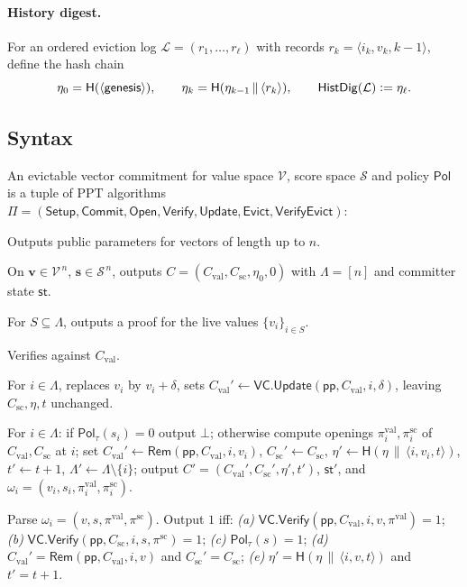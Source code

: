 \documentclass[version=submission]{iacrcc}
\theoremstyle{definition}
\newcommand{\secpar}{\lambda}
\newcommand{\PPT}{\mathrm{PPT}}
\newcommand{\bit}{\{0,1\}}
\newcommand{\defeq}{\vcentcolon=}
\newcommand{\concat}{\,\|\,}
\newcommand{\Setup}{\mathsf{Setup}}
\newcommand{\Commit}{\mathsf{Commit}}
\newcommand{\Open}{\mathsf{Open}}
\newcommand{\Vfy}{\mathsf{Verify}}
\newcommand{\Update}{\mathsf{Update}}
\newcommand{\Evict}{\mathsf{Evict}}
\newcommand{\VfyEvict}{\mathsf{VerifyEvict}}
\newcommand{\Rem}{\mathsf{Rem}}
\newcommand{\pp}{\mathsf{pp}}
\newcommand{\aux}{\mathsf{st}}
\newcommand{\Pol}{\mathsf{Pol}}
\newcommand{\HistDig}{\mathsf{HistDig}}
\newcommand{\Val}{\mathrm{val}}
\newcommand{\Sc}{\mathrm{sc}}
\newcommand{\Cval}{C_{\Val}}
\newcommand{\Csc}{C_{\Sc}}
\newcommand{\Live}{\Lambda}
\newcommand{\Vsp}{\mathcal{V}}
\newcommand{\Ssp}{\mathcal{S}}
\newcommand{\hash}{\mathsf{H}}
\newcommand{\VC}{\mathsf{VC}}
\newcommand{\Log}{\mathcal{L}}
\begin{document}
\paragraph{History digest.}
For an ordered eviction log $\Log=(r_1,\dots,r_\ell)$ with records
$r_k=\langle i_k,v_k,k-1\rangle$, define the hash chain
\[
  \eta_0=\hash(\langle\textsf{genesis}\rangle),\qquad
  \eta_k=\hash(\eta_{k-1}\concat\langle r_k\rangle),\qquad
  \HistDig(\Log)\defeq\eta_\ell .
\]

\subsection{Syntax}

\begin{definition}[EvictVC]\label{def:evictvc}
An evictable vector commitment for value space $\Vsp$, score space $\Ssp$ and
policy $\Pol$ is a tuple of $\PPT$ algorithms
$\Pi=(\Setup,\Commit,\Open,\Vfy,\Update,\Evict,\VfyEvict)$:
\begin{description}[leftmargin=0em,itemsep=4pt]
\item[$\Setup(1^\secpar,1^n)\to\pp$.] Outputs public parameters for vectors of
      length up to $n$.
\item[$\Commit(\pp,\mathbf{v},\mathbf{s})\to(C,\aux)$.] On
      $\mathbf{v}\in\Vsp^{\,n}$, $\mathbf{s}\in\Ssp^{\,n}$, outputs
      $C=(\Cval,\Csc,\eta_0,0)$ with $\Live=[n]$ and committer state $\aux$.
\item[$\Open(\pp,\aux,S)\to\pi$.] For $S\subseteq\Live$, outputs a proof for the
      live values $\{v_i\}_{i\in S}$.
\item[$\Vfy(\pp,C,S,\{v_i\}_{i\in S},\pi)\to\bit$.] Verifies against $\Cval$.
\item[$\Update(\pp,\aux,i,\delta)\to(C',\aux')$.] For $i\in\Live$, replaces $v_i$
      by $v_i+\delta$, sets $\Cval'\leftarrow\VC.\Update(\pp,\Cval,i,\delta)$,
      leaving $\Csc,\eta,t$ unchanged.
\item[$\Evict(\pp,\aux,i,\tau)\to(C',\aux',\omega_i)$ \textnormal{or} $\bot$.]
      For $i\in\Live$: if $\Pol_\tau(s_i)=0$ output $\bot$; otherwise compute
      openings $\pi_i^{\Val},\pi_i^{\Sc}$ of $\Cval,\Csc$ at $i$; set
      $\Cval'\leftarrow\Rem(\pp,\Cval,i,v_i)$, $\Csc'\leftarrow\Csc$,
      $\eta'\leftarrow\hash(\eta\concat\langle i,v_i,t\rangle)$, $t'\leftarrow t+1$,
      $\Live'\leftarrow\Live\setminus\{i\}$; output $C'=(\Cval',\Csc',\eta',t')$,
      $\aux'$, and $\omega_i=(v_i,s_i,\pi_i^{\Val},\pi_i^{\Sc})$.
\item[$\VfyEvict(\pp,C,i,\tau,\omega_i,C')\to\bit$.] Parse
      $\omega_i=(v,s,\pi^{\Val},\pi^{\Sc})$. Output $1$ iff:
      \emph{(a)} $\VC.\Vfy(\pp,\Cval,i,v,\pi^{\Val})=1$;
      \emph{(b)} $\VC.\Vfy(\pp,\Csc,i,s,\pi^{\Sc})=1$;
      \emph{(c)} $\Pol_\tau(s)=1$;
      \emph{(d)} $\Cval'=\Rem(\pp,\Cval,i,v)$ and $\Csc'=\Csc$;
      \emph{(e)} $\eta'=\hash(\eta\concat\langle i,v,t\rangle)$ and $t'=t+1$.
\end{description}
\end{definition}
\end{document}
